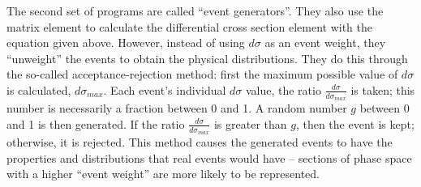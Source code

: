 The second set of programs are called ``event generators''.  
They also use the matrix element to calculate 
the differential cross section element %
with the equation given above.  
However, instead of using $d\sigma$ as an event weight, 
they ``unweight'' the events to obtain the physical 
distributions.  
They do this through the so-called acceptance-rejection method: 
first the maximum possible value of $d\sigma$ is calculated, 
$d\sigma_{max}$. 
Each event's individual $d\sigma$ value, 
the ratio $\frac{d\sigma}{d\sigma_{max}}$ is taken; 
this number is necessarily a fraction between 0 and 1.  
A random number $g$ between 0 and 1 is then generated.  
If the ratio $\frac{d\sigma}{d\sigma_{max}}$ is greater 
than $g$, then the event is kept; %
otherwise, it is rejected.  
This method causes the generated events to have the properties 
and distributions that real events would have -- %
sections of phase space with a higher ``event weight'' 
are more likely to be represented.  




